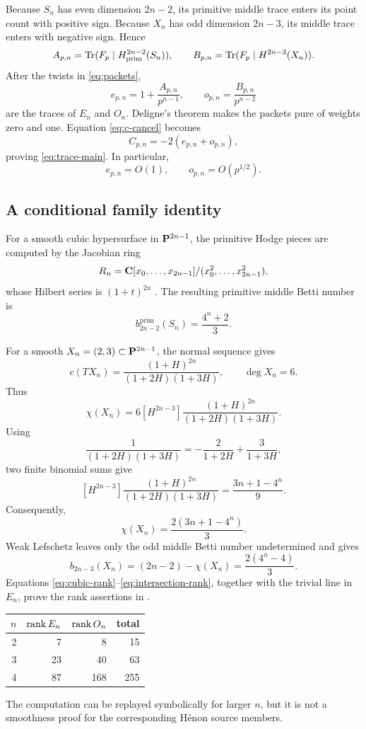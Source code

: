 Because \(S_n\) has even dimension \(2n-2\), its primitive middle trace
enters its point count with positive sign.  Because \(X_n\) has odd
dimension \(2n-3\), its middle trace enters with negative sign.  Hence
\[
 A_{p,n}=\operatorname{Tr}(F_p\mid H^{2n-2}_{\mathrm{prim}}(S_n)),\qquad
 B_{p,n}=\operatorname{Tr}(F_p\mid H^{2n-3}(X_n)).
\]
After the twists in \eqref{eq:packets},
\[
 e_{p,n}=1+\frac{A_{p,n}}{p^{n-1}},\qquad
 o_{p,n}=\frac{B_{p,n}}{p^{n-2}}
\]
are the traces of \(E_n\) and \(O_n\).  Deligne's theorem
\cite[Theorem 1.6]{Deligne1974} makes the packets pure of weights zero
and one.  Equation \eqref{eq:c-cancel} becomes
\[
 C_{p,n}=-2(e_{p,n}+o_{p,n}),
\]
proving \eqref{eq:trace-main}.  In particular,
\[
 e_{p,n}=O(1),\qquad o_{p,n}=O(p^{1/2}).
\]

\subsection{A conditional family identity}

For a smooth cubic hypersurface in \(\mathbf P^{2n-1}\), the primitive Hodge
pieces are computed by the Jacobian ring
\[
 R_n=\mathbf C[x_0,\ldots,x_{2n-1}]/(x_0^2,\ldots,x_{2n-1}^2),
\]
whose Hilbert series is \((1+t)^{2n}\)
\cite[§10, especially Theorem 10.8]{Griffiths1969II}.  The resulting
primitive middle Betti number is
\begin{equation}\label{eq:cubic-rank}
 b^{\mathrm{prim}}_{2n-2}(S_n)=\frac{4^n+2}{3}.
\end{equation}

For a smooth \(X_n=(2,3)\subset\mathbf P^{2n-1}\), the normal sequence gives
\[
 c(TX_n)=\frac{(1+H)^{2n}}{(1+2H)(1+3H)},\qquad \deg X_n=6.
\]
Thus
\[
 \chi(X_n)=6[H^{2n-3}]
 \frac{(1+H)^{2n}}{(1+2H)(1+3H)}.
\]
Using
\[
 \frac1{(1+2H)(1+3H)}
 =-\frac2{1+2H}+\frac3{1+3H},
\]
two finite binomial sums give
\[
 [H^{2n-3}]
 \frac{(1+H)^{2n}}{(1+2H)(1+3H)}
 =\frac{3n+1-4^n}{9}.
\]
Consequently,
\[
 \chi(X_n)=\frac{2(3n+1-4^n)}3.
\]
Weak Lefschetz \cite[Expos\'e XIV, Corollaire 4.6]{SGA2} leaves only
the odd middle Betti number undetermined and gives
\begin{equation}\label{eq:intersection-rank}
 b_{2n-3}(X_n)=(2n-2)-\chi(X_n)
 =\frac{2(4^n-4)}3.
\end{equation}
Equations \eqref{eq:cubic-rank}--\eqref{eq:intersection-rank}, together
with the trivial line in \(E_n\), prove the rank assertions in
.

\begin{center}
\begin{tabular}{@{}rrrr@{}}
\toprule
\(n\)&\(\operatorname{rank} E_n\)&\(\operatorname{rank} O_n\)&total\\
\midrule
2&7&8&15\\
3&23&40&63\\
4&87&168&255\\
\bottomrule
\end{tabular}
\end{center}

The computation can be replayed symbolically for larger \(n\), but it is
not a smoothness proof for the corresponding H\'enon source members.
